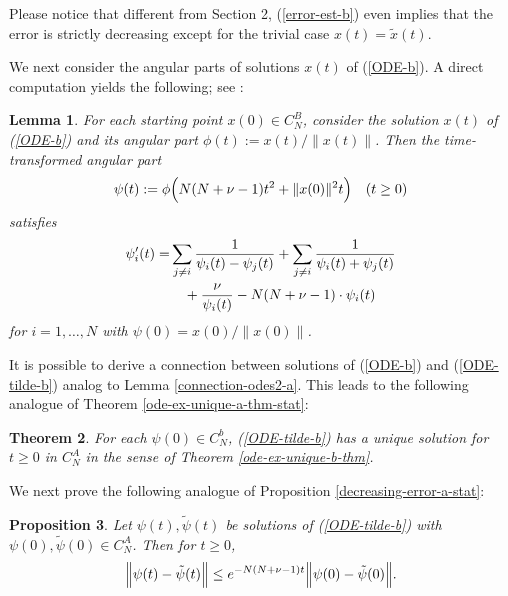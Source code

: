 \documentclass[reqno]{amsart}
\theoremstyle{plain}
\newtheorem{theorem}{Theorem}[section]
\newtheorem{lemma}[theorem]{Lemma}
\newtheorem{proposition}[theorem]{Proposition}
\theoremstyle{definition}
\numberwithin{equation}{section}
\begin{document}
 Please notice that different from Section 2, (\ref{error-est-b}) even implies that the error is strictly decreasing except for
 the trivial case $x(t)=\tilde x(t)$.

We next consider the angular parts  of   solutions  $x(t)$ of (\ref{ODE-b}).
A direct computation yields the following; see \cite{VW3}:


\begin{lemma}\label{stabilily-lemma1-b}
  For each starting point $x(0)\in C_N^B $, consider the solution $x(t)$  of (\ref{ODE-b}) and its angular part
  $\phi(t):=x(t)/\|x(t)\|$.
  Then the time-transformed angular part
  \begin{equation}\label{time-transform-b}
    \psi(t) := \phi\Bigl( N(N+\nu-1)t^2+ \|x(0)\|^2t \Bigr) \quad(t\ge0)
    \end{equation}
satisfies
\begin{align}\label{ODE-tilde-b}
{\psi}_i^\prime(t) = &\sum_{j\ne i}  \frac{1}{\psi_{i}(t)-\psi_{j}(t)}+
\sum_{j\ne i}  \frac{1}{\psi_{i}(t)+\psi_{j}(t)}
 \notag\\
&\quad
+\frac{ \nu}{  \psi_{i}(t)} -   N(N+\nu-1)\cdot \psi_{i}(t)
\end{align}
for $i=1,\ldots,N$ with $\psi(0)=x(0)/\|x(0)\|$. 
\end{lemma}

It is possible to derive a connection between solutions of (\ref{ODE-b}) and  (\ref{ODE-tilde-b}) analog to Lemma
\ref{connection-odes2-a}. This leads to the following analogue of Theorem \ref{ode-ex-unique-a-thm-stat}: 

 

\begin{theorem}\label{ode-ex-unique-b-thm-stat}
For each $\psi(0)\in C_N^b$,  (\ref{ODE-tilde-b})
has a unique solution for  $t\ge0$ in  $ C_N^A$ in the sense of Theorem \ref{ode-ex-unique-b-thm}.
\end{theorem}


We next prove the following analogue of Proposition
 \ref{decreasing-error-a-stat}:



\begin{proposition}\label{decreasing-error-b-stat}
  Let  $\psi(t),\tilde \psi(t)$ be solutions of (\ref{ODE-tilde-b}) with $\psi(0),\tilde \psi(0)\in C_N^A$.
Then for $t\ge0$,
  $$\Bigl\|\psi(t)-\tilde \psi(t)\Bigr\|\le  e^{- N(N+\nu-1) t}\Bigl\|\psi(0)-\tilde \psi(0)\Bigr\|.$$ 
 \end{proposition}
\end{document}
